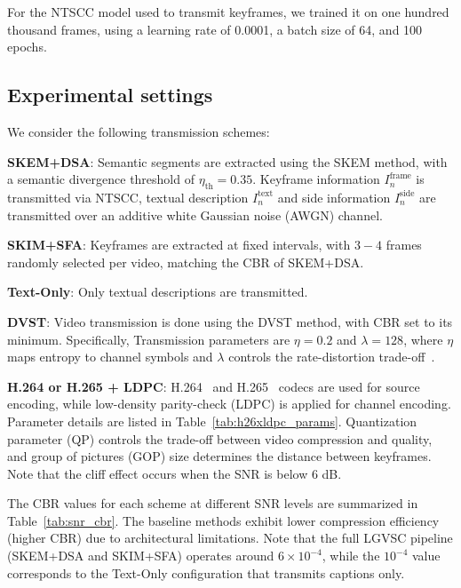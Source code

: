 \documentclass[10pt,journal]{IEEEtran}
\begin{document}
For the NTSCC model used to transmit keyframes, we trained it on one hundred thousand frames, using a learning rate of 0.0001, a batch size of 64, and 100 epochs. 
\subsection{Experimental settings}






We consider the following transmission schemes:

\textbf{SKEM+DSA}: Semantic segments are extracted using the SKEM method, with a semantic divergence threshold of $\eta_{\text{th}} = 0.35$. Keyframe information $I^\text{frame}_n$ is transmitted via NTSCC, textual description $I^{\text{text}}_n$ and side information $I^{\text{side}}_n$ are transmitted over an additive white Gaussian noise (AWGN) channel.

\textbf{SKIM+SFA}: Keyframes are extracted at fixed intervals, with $3-4$ frames randomly selected per video, matching the CBR of SKEM+DSA.

\textbf{Text-Only}: Only textual descriptions are transmitted.

\textbf{DVST}: Video transmission is done using the DVST method, with CBR set to its minimum. Specifically, Transmission parameters are $\eta = 0.2$ and $\lambda = 128$, where $\eta$ maps entropy to channel symbols and $\lambda$ controls the rate-distortion trade-off~\cite{wangDVSTWirelessDeepVideo2023}.

\textbf{H.264 or H.265 + LDPC}: H.264~\cite{h264} and H.265~\cite{h265} codecs are used for source encoding, while low-density parity-check (LDPC) is applied for channel encoding. Parameter details are listed in Table~\ref{tab:h26xldpc_params}. Quantization parameter (QP) controls the trade-off between video compression and quality, and group of pictures (GOP) size determines the distance between keyframes. Note that the cliff effect occurs when the SNR is below 6 dB.

The CBR values for each scheme at different SNR levels are summarized in Table~\ref{tab:snr_cbr}. The baseline methods exhibit lower compression efficiency (higher CBR) due to architectural limitations. {Note that the full LGVSC pipeline (SKEM+DSA and SKIM+SFA) operates around $6\times10^{-4}$, while the $10^{-4}$ value corresponds to the Text-Only configuration that transmits captions only.}
\end{document}
